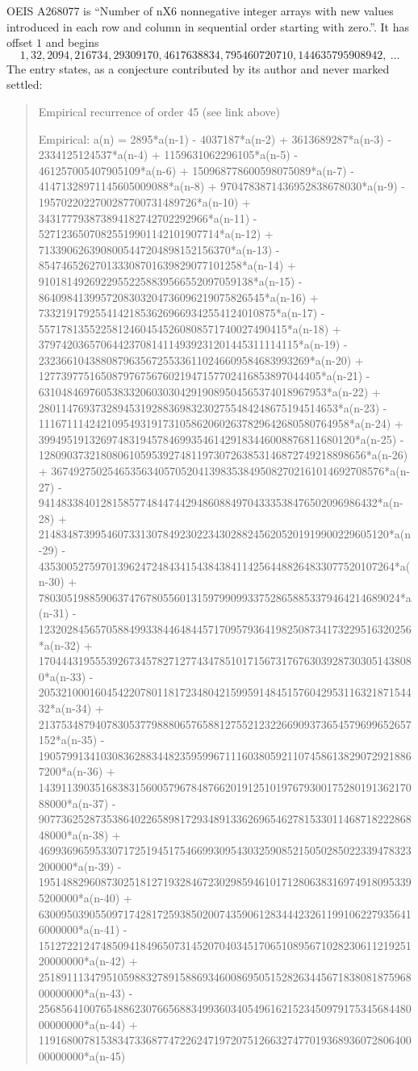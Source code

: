 \documentclass[11pt,a4paper]{article}
\theoremstyle{plain}
\theoremstyle{definition}
\begin{document}
OEIS A268077 is ``Number of nX6 nonnegative integer arrays with new values introduced in each row and column in sequential order starting with zero.''. It has offset $1$ and begins
\[
1, 32, 2094, 216734, 29309170, 4617638834, 795460720710, 144635795908942,\ \dots
\]
The entry states, as a conjecture contributed by its author and never marked settled:
\begin{quote}\raggedright\small
Empirical recurrence of order 45 (see link above)

Empirical: a(n) = 2895*a(n-1) - 4037187*a(n-2) + 3613689287*a(n-3) - 2334125124537*a(n-4) + 1159631062296105*a(n-5) - 461257005407905109*a(n-6) + 150968778600598075089*a(n-7) - 41471328971145605009088*a(n-8) + 9704783871436952838678030*a(n-9) - 1957022022700287700731489726*a(n-10) + 343177793873894182742702292966*a(n-11) - 52712365070825519901142101907714*a(n-12) + 7133906263908005447204898152156370*a(n-13) - 854746526270133308701639829077101258*a(n-14) + 91018149269229552258839566552097059138*a(n-15) - 8640984139957208303204736096219075826545*a(n-16) + 733219179255414218536269669342554124010875*a(n-17) - 55717813552258124604545260808571740027490415*a(n-18) + 3797420365706442370814114939231201445311114115*a(n-19) - 232366104388087963567255336110246609584683993269*a(n-20) + 12773977516508797675676021947157702416853897044405*a(n-21) - 631048469760538332060303042919089504565374018967953*a(n-22) + 28011476937328945319288369832302755484248675194514653*a(n-23) - 1116711142421095493191731058620602637829642680580764958*a(n-24) + 39949519132697483194578469935461429183446008876811680120*a(n-25) - 1280903732180806105953927481197307263853146872749218898656*a(n-26) + 36749275025465356340570520413983538495082702161014692708576*a(n-27) - 941483384012815857748447442948608849704333538476502096986432*a(n-28) + 21483487399546073313078492302234302882456205201919900229605120*a(n-29) - 435300527597013962472484341543843841142564488264833077520107264*a(n-30) + 7803051988590637476780556013159799099337528658853379464214689024*a(n-31) - 123202845657058849933844648445717095793641982508734173229516320256*a(n-32) + 1704443195553926734578271277434785101715673176763039287303051438080*a(n-33) - 20532100016045422078011817234804215995914845157604295311632187154432*a(n-34) + 213753487940783053779888065765881275521232266909373654579699652657152*a(n-35) - 1905799134103083628834482359599671116038059211074586138290729218867200*a(n-36) + 14391139035168383156005796784876620191251019767930017528019136217088000*a(n-37) - 90773625287353864022658981729348913362696546278153301146871822286848000*a(n-38) + 469936965953307172519451754669930954303259085215050285022339478323200000*a(n-39) - 1951488296087302518127193284672302985946101712806383169749180953395200000*a(n-40) + 6300950390550971742817259385020074359061283444232611991062279356416000000*a(n-41) - 15127221247485094184965073145207040345170651089567102823061121925120000000*a(n-42) + 25189111347951059883278915886934600869505152826344567183808187596800000000*a(n-43) - 25685641007654886230766568834993603405496162152345097917534568448000000000*a(n-44) + 11916800781538347336877472262471972075126632747701936893607280640000000000*a(n-45)
\end{quote}
\end{document}
